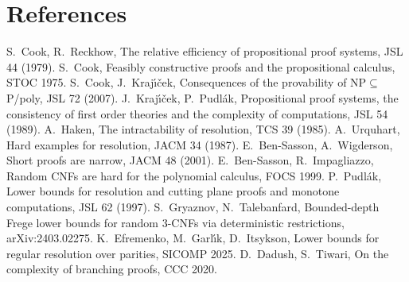 \documentclass[11pt]{article}
\theoremstyle{definition}
\begin{document}
\section*{References}
\small
S.~Cook, R.~Reckhow, The relative efficiency of propositional proof systems, JSL 44 (1979).
S.~Cook, Feasibly constructive proofs and the propositional calculus, STOC 1975.
S.~Cook, J.~Kraj\'{\i}\v{c}ek, Consequences of the provability of NP$\subseteq$P/poly, JSL 72 (2007).
J.~Kraj\'{\i}\v{c}ek, P.~Pudl\'ak, Propositional proof systems, the consistency of first order theories and the complexity of computations, JSL 54 (1989).
A.~Haken, The intractability of resolution, TCS 39 (1985).
A.~Urquhart, Hard examples for resolution, JACM 34 (1987).
E.~Ben-Sasson, A.~Wigderson, Short proofs are narrow, JACM 48 (2001).
E.~Ben-Sasson, R.~Impagliazzo, Random CNFs are hard for the polynomial calculus, FOCS 1999.
P.~Pudl\'ak, Lower bounds for resolution and cutting plane proofs and monotone computations, JSL 62 (1997).
S.~Gryaznov, N.~Talebanfard, Bounded-depth Frege lower bounds for random 3-CNFs via deterministic restrictions, arXiv:2403.02275.
K.~Efremenko, M.~Garl\'{\i}k, D.~Itsykson, Lower bounds for regular resolution over parities, SICOMP 2025.
D.~Dadush, S.~Tiwari, On the complexity of branching proofs, CCC 2020.

\end{document}
